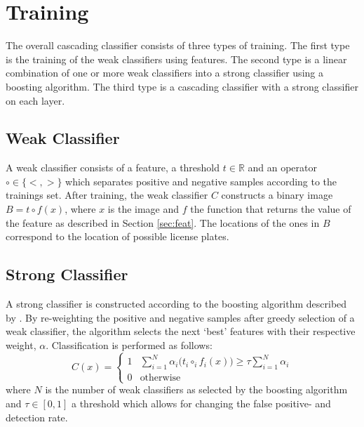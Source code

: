 \documentclass[a4paper,11pt]{article}
\begin{document}


\section{Training} \label{sec:train}
The overall cascading classifier consists of three types of training. The first
type is the training of the weak classifiers using features. The second type is
a linear combination of one or more weak classifiers into a strong classifier
using a boosting algorithm. The third type is a cascading classifier
with a strong classifier on each layer.

\subsection{Weak Classifier} \label{sec:weak}
A weak classifier consists of a feature, a threshold $t \in \mathbb{R}$ and an
operator $\circ \in \{<, >\}$ which separates positive and negative samples
according to the trainings set. After training, the weak classifier $C$
constructs a binary image $B = t \circ f(x)$, where $x$ is the image and $f$
the function that returns the value of the feature as described in 
Section \ref{sec:feat}. The locations of the ones in $B$ correspond to the location of
possible license plates.

\subsection{Strong Classifier} \label{sec:strong}
A strong classifier is constructed according to the boosting algorithm
described by \cite{viola}. By re-weighting the positive and negative samples
after greedy selection of a weak classifier, the algorithm selects the next
`best' features with their respective weight, $\alpha$. Classification is
performed as follows:
\begin{displaymath}
C(x) = 
	\left\{ \begin{array}{ll}
		1 & \sum^N_{i=1} \alpha_i \big(t_i \circ_i f_i(x)\big) \ge \tau \sum^N_{i=1}\alpha_i \\
		0 & \textrm{otherwise}
	\end{array} \right.
\end{displaymath}
where $N$ is the number of weak classifiers as selected by the boosting
algorithm and $\tau \in [0,1]$ a threshold which allows for changing the false
positive- and detection rate.
\end{document}
